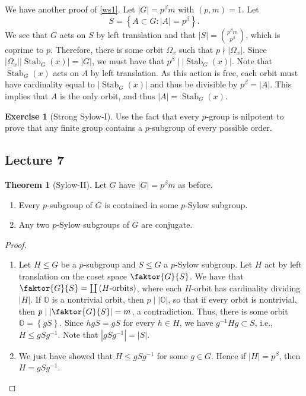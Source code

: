 \documentclass[10pt,letterpaper,cm]{nupset}
\theoremstyle{definition}
\theoremstyle{theorem}
\newtheorem{theorem}[definition]{Theorem}
\newtheorem{exercise}[definition]{Exercise}
\theoremstyle{remark}
\newcommand{\1}{\mathbf{1}}
\newcommand{\0}{\vec 0}
\DeclareMathOperator{\stab}{Stab}
\begin{document}
We have another proof of \cref{ws1}. Let $\left\lvert{G}\right\rvert = p^{\beta}m$ with $\left(p, m\right) =1$. Let $$ S = \left\{A\subset G : \left\lvert{A}\right\rvert = p^{\beta}\right\}.$$ We see that $G$ acts on $S$ by left translation and that $\left\lvert{S}\right\rvert = {p^{\beta}m \choose p^{\beta}}$, which is coprime to $p$. Therefore, there is some orbit $\Omega_x$ such that $p \nmid  \left\lvert{\Omega_x}\right\rvert$. Since $\left\lvert{\Omega_x}\right\rvert \left\lvert{\stab_G(x)}\right\rvert = \left\lvert{G}\right\rvert$, we must have that $p^{\beta} \mid \left\lvert{\stab_G(x)}\right\rvert$. Note that $\stab_G(x)$ acts on $A$ by left translation. As this action is free, each orbit must have cardinality equal to $\left\lvert{\stab_G(x)}\right\rvert$ and thus be divisible by $p^{\beta} =\left\lvert{A}\right\rvert$. This implies that $A$ is the only orbit, and thus $\left\lvert{A}\right\rvert = \stab_G(x)$.



\begin{exercise}[Strong Sylow-I]
Use the fact that every $p$-group is nilpotent to prove that any finite group contains a $p$-subgroup of every possible order.
\end{exercise}

\subsection{Lecture 7}

\begin{theorem}[Sylow-II] Let $G$ have $\left\lvert{G}\right\rvert= p^{\beta}m$ as before.
\begin{enumerate}
\item Every $p$-subgroup of $G$ is contained in some $p$-Sylow subgroup.
\item Any two $p$-Sylow subgroups of $G$ are conjugate.
\end{enumerate}
\end{theorem}

\begin{proof} $ $
\begin{enumerate}
\item Let $H\leq G$ be a $p$-subgroup and $S\leq G$ a $p$-Sylow subgroup.  Let $H$ act by left translation on the coset space $\faktor{G}{S}$. We have that $\faktor{G}{S} = \coprod \left(H\text{-orbits}\right)$, where each $H$-orbit has cardinality dividing $\left\lvert{H}\right\rvert$. If $\mathds{O}$ is a nontrivial orbit, then $p\mid \left\lvert{\mathds{O}}\right\rvert$, so that if every orbit is nontrivial, then $p\mid \left\lvert{\faktor{G}{S}}\right\rvert =m$, a contradiction. Thus, there is some orbit $\mathds{O} = \left\{gS\right\}$. Since $hgS = gS$ for every $h\in H$, we have $g^{-1}Hg\subset S$, i.e., $H\leq gSg^{-1}$. Note that $\left\lvert{gSg^{-1}}\right\rvert=\left\lvert{S}\right\rvert$.
\item We just have showed that $H\leq gSg^{-1}$ for some $g\in G$. Hence if $\left\lvert{H}\right\rvert = p^{\beta}$, then $H=gSg^{-1}$.
\end{enumerate}
\end{proof}
\end{document}
